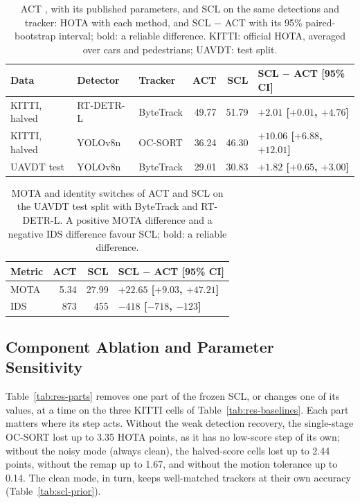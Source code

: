\begin{table}[tbp]
\centering
\caption{ACT \cite{act2026adaptive}, with its published parameters, and SCL on the same detections and tracker: HOTA with each method, and SCL $-$ ACT with its 95\% paired-bootstrap interval; bold: a reliable difference. KITTI: official HOTA, averaged over cars and pedestrians; UAVDT: test split.}
\label{tab:res-act}
\begin{tabular}{lllrrl}
\toprule
Data & Detector & Tracker & ACT & SCL & SCL $-$ ACT [95\% CI]\\
\midrule
KITTI, halved & RT-DETR-L & ByteTrack & 49.77 & 51.79 & \textbf{$+2.01$ [$+0.01$, $+4.76$]}\\
KITTI, halved & YOLOv8n & OC-SORT & 36.24 & 46.30 & \textbf{$+10.06$ [$+6.88$, $+12.01$]}\\
UAVDT test & YOLOv8n & ByteTrack & 29.01 & 30.83 & \textbf{$+1.82$ [$+0.65$, $+3.00$]}\\
\bottomrule
\end{tabular}
\end{table}

\begin{table}[tbp]
\centering
\caption{MOTA and identity switches of ACT and SCL on the UAVDT test split with ByteTrack and RT-DETR-L. A positive MOTA difference and a negative IDS difference favour SCL; bold: a reliable difference.}
\label{tab:res-act-uavdt}
\begin{tabular}{lrrl}
\toprule
Metric & ACT & SCL & SCL $-$ ACT [95\% CI]\\
\midrule
MOTA & 5.34 & 27.99 & \textbf{$+22.65$ [$+9.03$, $+47.21$]}\\
IDS & 873 & 455 & \textbf{$-418$ [$-718$, $-123$]}\\
\bottomrule
\end{tabular}
\end{table}

\subsection{Component Ablation and Parameter Sensitivity}\label{sec:res-parts}
Table~\ref{tab:res-parts} removes one part of the frozen SCL, or changes one of its values, at a time on the three KITTI cells of Table~\ref{tab:res-baselines}. Each part matters where its step acts. Without the weak detection recovery, the single-stage OC-SORT lost up to 3.35 HOTA points, as it has no low-score step of its own; without the noisy mode (always clean), the halved-score cells lost up to 2.44 points, without the remap up to 1.67, and without the motion tolerance up to 0.14. The clean mode, in turn, keeps well-matched trackers at their own accuracy (Table~\ref{tab:scl-prior}).


